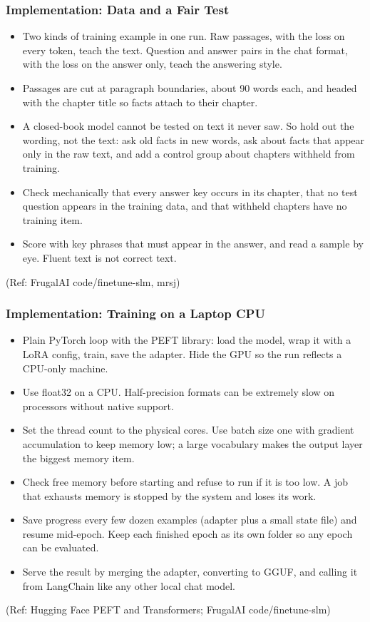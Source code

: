 \begin{frame}[fragile]\frametitle{Implementation: Data and a Fair Test}
\begin{itemize}
\item Two kinds of training example in one run. Raw passages, with the loss on every token, teach the text. Question and answer pairs in the chat format, with the loss on the answer only, teach the answering style.
\item Passages are cut at paragraph boundaries, about 90 words each, and headed with the chapter title so facts attach to their chapter.
\item A closed-book model cannot be tested on text it never saw. So hold out the wording, not the text: ask old facts in new words, ask about facts that appear only in the raw text, and add a control group about chapters withheld from training.
\item Check mechanically that every answer key occurs in its chapter, that no test question appears in the training data, and that withheld chapters have no training item.
\item Score with key phrases that must appear in the answer, and read a sample by eye. Fluent text is not correct text.
\end{itemize}
{\tiny (Ref: FrugalAI code/finetune-slm, mrsj)}
\end{frame}

\begin{frame}[fragile]\frametitle{Implementation: Training on a Laptop CPU}
\begin{itemize}
\item Plain PyTorch loop with the PEFT library: load the model, wrap it with a LoRA config, train, save the adapter. Hide the GPU so the run reflects a CPU-only machine.
\item Use float32 on a CPU. Half-precision formats can be extremely slow on processors without native support.
\item Set the thread count to the physical cores. Use batch size one with gradient accumulation to keep memory low; a large vocabulary makes the output layer the biggest memory item.
\item Check free memory before starting and refuse to run if it is too low. A job that exhausts memory is stopped by the system and loses its work.
\item Save progress every few dozen examples (adapter plus a small state file) and resume mid-epoch. Keep each finished epoch as its own folder so any epoch can be evaluated.
\item Serve the result by merging the adapter, converting to GGUF, and calling it from LangChain like any other local chat model.
\end{itemize}
{\tiny (Ref: Hugging Face PEFT and Transformers; FrugalAI code/finetune-slm)}
\end{frame}
